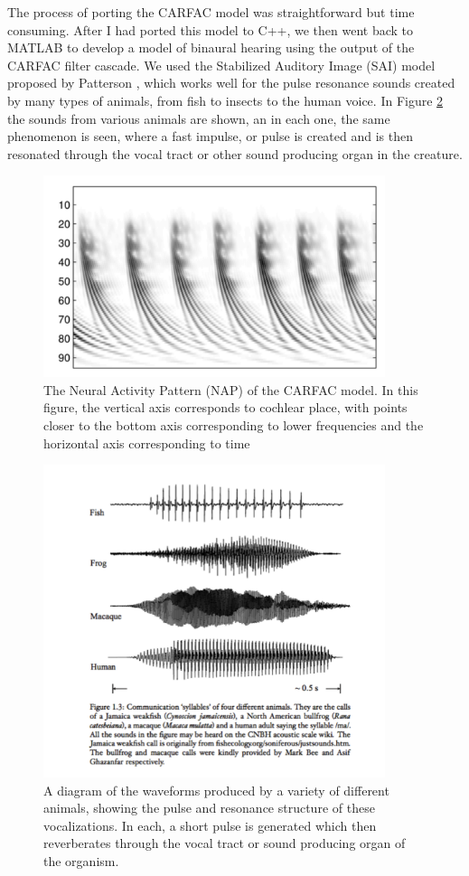 \documentclass[12pt,oneside]{book}
\begin{document}
The process of porting the CARFAC model was straightforward but time
consuming.  After I had ported this model to C++, we then went back to
MATLAB to develop a model of binaural hearing using the output of the
CARFAC filter cascade.  We used the Stabilized Auditory Image (SAI) model
proposed by Patterson \cite{patterson92}, which works well for the
pulse resonance sounds created by many types of animals, from fish to
insects to the human voice.  In Figure \ref{fig:pulseresonance} the
sounds from various animals are shown, an in each one, the same
phenomenon is seen, where a fast impulse, or pulse is created and is
then resonated through the vocal tract or other sound producing organ
in the creature.

\begin{figure}[t]
\begin{center}
\includegraphics[width=100mm]{figures/nap}
\caption{ The Neural Activity Pattern (NAP) of the CARFAC model.  In
  this figure, the vertical axis corresponds to cochlear place, with
  points closer to the bottom axis corresponding to lower frequencies
  and the horizontal axis corresponding to time}
\label{fig:nap} 
\end{center} 
\end{figure} 

\begin{figure}[t]
\begin{center}
\includegraphics[width=100mm]{figures/pulseresonance}
\caption{ A diagram of the waveforms produced by a variety of
  different animals, showing the pulse and resonance structure of
  these vocalizations.  In each, a short pulse is generated which then
  reverberates through the vocal tract or sound producing organ of the
  organism.}
\label{fig:pulseresonance} 
\end{center} 
\end{figure} 
\end{document}
